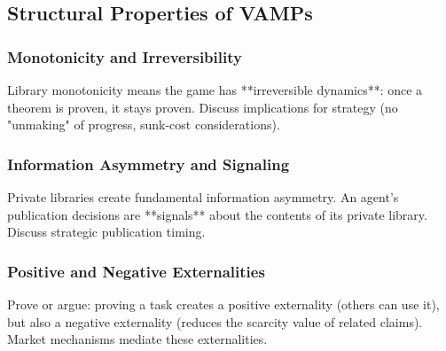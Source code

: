 \subsection{Structural Properties of VAMPs}

\subsubsection{Monotonicity and Irreversibility}
Library monotonicity means the game has **irreversible dynamics**: once a theorem is proven, it stays proven. Discuss implications for strategy (no "unmaking" of progress, sunk-cost considerations).

\subsubsection{Information Asymmetry and Signaling}
Private libraries create fundamental information asymmetry. An agent's publication decisions are **signals** about the contents of its private library. Discuss strategic publication timing.

\subsubsection{Positive and Negative Externalities}
Prove or argue: proving a task creates a positive externality (others can use it), but also a negative externality (reduces the scarcity value of related claims). Market mechanisms mediate these externalities.

